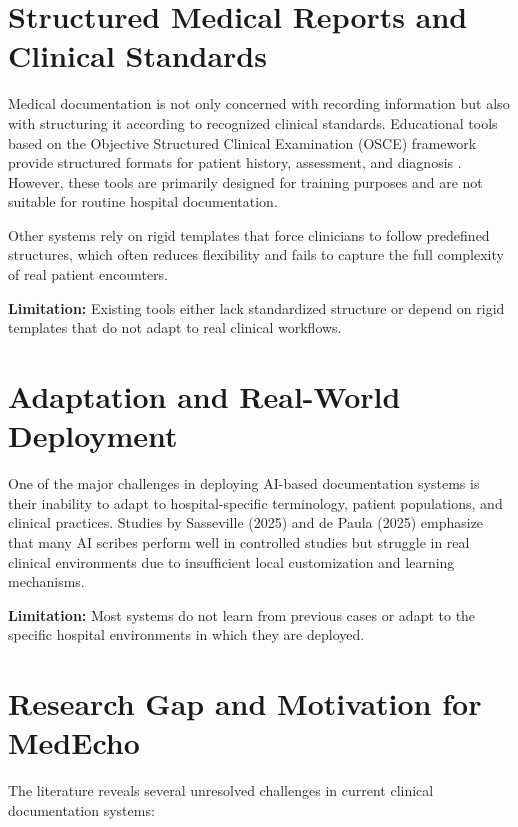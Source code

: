 \section{Structured Medical Reports and Clinical Standards}
\label{sec:lit:structure}

Medical documentation is not only concerned with recording information but also with structuring it according to recognized clinical standards. Educational tools based on the Objective Structured Clinical Examination (OSCE) framework provide structured formats for patient history, assessment, and diagnosis \cite{harden1975assessment}. However, these tools are primarily designed for training purposes and are not suitable for routine hospital documentation.

Other systems rely on rigid templates that force clinicians to follow predefined structures, which often reduces flexibility and fails to capture the full complexity of real patient encounters.

\textbf{Limitation:}  
Existing tools either lack standardized structure or depend on rigid templates that do not adapt to real clinical workflows.

\section{Adaptation and Real-World Deployment}
\label{sec:lit:adaptation}

One of the major challenges in deploying AI-based documentation systems is their inability to adapt to hospital-specific terminology, patient populations, and clinical practices. Studies by Sasseville (2025) \cite{sasseville2025adaptation} and de Paula (2025) \cite{depaula2025realworld} emphasize that many AI scribes perform well in controlled studies but struggle in real clinical environments due to insufficient local customization and learning mechanisms.

\textbf{Limitation:}  
Most systems do not learn from previous cases or adapt to the specific hospital environments in which they are deployed.

\section{Research Gap and Motivation for MedEcho}
\label{sec:lit:gap}

The literature reveals several unresolved challenges in current clinical documentation systems:

